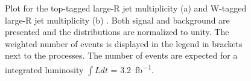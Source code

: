 \begin{figure}[h]
    \centering
    \caption{Plot for the top-tagged large-R jet multiplicity (a) and W-tagged large-R jet multiplicity (b) . 
Both signal and background are presented and the distributions are normalized to unity. 
The weighted number of events is displayed in the legend in brackets next to the processes. 
The number of events are expected for a integrated luminosity $\int L dt$ = \SI{3.2}{fb^{-1}}.}
    \label{fig::stop}   
\end{figure}




